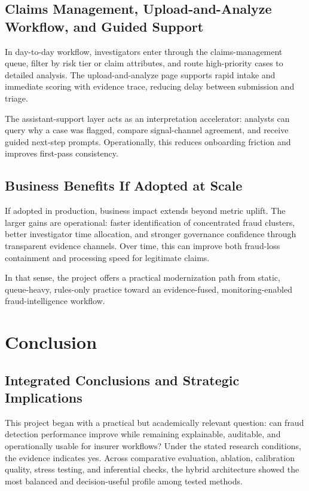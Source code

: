\documentclass[12pt,a4paper]{report}
\begin{document}
\section{Claims Management, Upload-and-Analyze Workflow, and Guided Support}
In day-to-day workflow, investigators enter through the claims-management queue, filter by risk tier or claim attributes, and route high-priority cases to detailed analysis. The upload-and-analyze page supports rapid intake and immediate scoring with evidence trace, reducing delay between submission and triage.

The assistant-support layer acts as an interpretation accelerator: analysts can query why a case was flagged, compare signal-channel agreement, and receive guided next-step prompts. Operationally, this reduces onboarding friction and improves first-pass consistency.

\section{Business Benefits If Adopted at Scale}
If adopted in production, business impact extends beyond metric uplift. The larger gains are operational: faster identification of concentrated fraud clusters, better investigator time allocation, and stronger governance confidence through transparent evidence channels. Over time, this can improve both fraud-loss containment and processing speed for legitimate claims.

In that sense, the project offers a practical modernization path from static, queue-heavy, rules-only practice toward an evidence-fused, monitoring-enabled fraud-intelligence workflow.

\chapter{Conclusion}
\section{Integrated Conclusions and Strategic Implications}
This project began with a practical but academically relevant question: can fraud detection performance improve while remaining explainable, auditable, and operationally usable for insurer workflows? Under the stated research conditions, the evidence indicates yes. Across comparative evaluation, ablation, calibration quality, stress testing, and inferential checks, the hybrid architecture showed the most balanced and decision-useful profile among tested methods.
\end{document}

